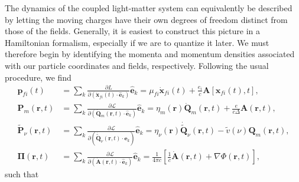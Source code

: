 \documentclass{article}
\begin{document}
The dynamics of the coupled light-matter system can equivalently be described by letting the moving charges have their own degrees of freedom distinct from those of the fields. Generally, it is easiest to construct this picture in a Hamiltonian formalism, especially if we are to quantize it later. We must therefore begin by identifying the momenta and momentum densities associated with our particle coordinates and fields, respectively. Following the usual procedure, we find
\begin{equation}
\begin{split}
\mathbf{p}_{fi}(t) &= \sum_k\frac{\partial L}{\partial\left(\dot{\mathbf{x}}_{fi}(t)\cdot\hat{\mathbf{e}}_k\right)}\hat{\mathbf{e}}_k = \mu_{fi}\dot{\mathbf{x}}_{fi}(t) + \frac{e_i}{c}\mathbf{A}[\mathbf{x}_{fi}(t),t],\\
\mathbf{P}_m(\mathbf{r},t) &= \sum_k\frac{\partial\mathcal{L}}{\partial\left(\dot{\mathbf{Q}}_m(\mathbf{r},t)\cdot\hat{\mathbf{e}}_k\right)}\hat{\mathbf{e}}_k = \eta_m(\mathbf{r})\dot{\mathbf{Q}}_m(\mathbf{r},t) + \frac{e}{c\Delta}\mathbf{A}(\mathbf{r},t),\\
\tilde{\mathbf{P}}_\nu(\mathbf{r},t) &= \sum_k\frac{\partial\mathcal{L}}{\partial\left(\dot{\tilde{\mathbf{Q}}}_\nu(\mathbf{r},t)\cdot\hat{\mathbf{e}}_k\right)}\hat{\mathbf{e}}_k = \eta_\nu(\mathbf{r})\dot{\tilde{\mathbf{Q}}}_\nu(\mathbf{r},t) - \tilde{v}(\nu)\mathbf{Q}_m(\mathbf{r},t),\\
\mathbf{\Pi}(\mathbf{r},t) &= \sum_k\frac{\partial\mathcal{L}}{\partial\left(\dot{\mathbf{A}}(\mathbf{r},t)\cdot\hat{\mathbf{e}}_k\right)}\hat{\mathbf{e}}_k = \frac{1}{4\pi c}\left[\frac{1}{c}\dot{\mathbf{A}}(\mathbf{r},t) + \nabla\Phi(\mathbf{r},t)\right],
\end{split}
\end{equation}
such that
\end{document}
